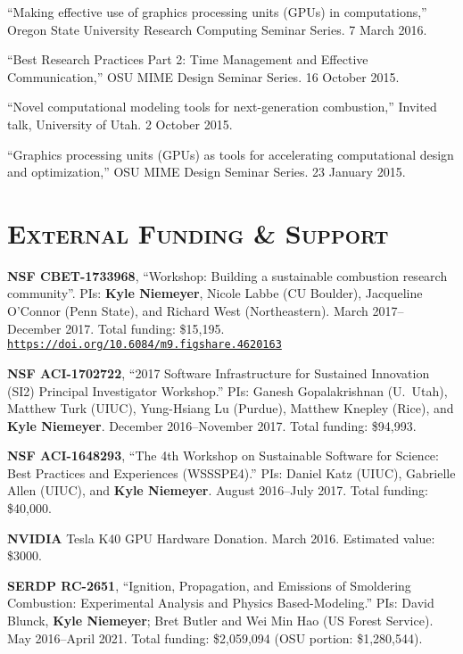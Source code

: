 \documentclass[margin,line,11pt]{res}
\makeatletter
\newlength{\bibhang}
\newlength{\bibsep}
 {\@listi \global\bibsep\itemsep \global\advance\bibsep by\parsep}
\newenvironment{bibenum*}
  {\renewcommand\labelenumi{\theenumi.}%
   \etaremune[
     topsep=0pt,
     itemsep=\bibsep,
     parsep=0pt,partopsep=0pt,
     itemindent=-\bibhang,
     leftmargin={\bibhang+\widthof{[999]}}]}
  {\endetaremune}
\newcommand*{\doi}[1]{\href{https://doi.org/#1}{\nolinkurl{https://doi.org/#1}}}
\makeatother
\begin{document}
\begin{resume}
\begin{bibenum*}
\item ``Making effective use of graphics processing units (GPUs) in computations,''
Oregon State University Research Computing Seminar Series. 7 March 2016.

\item ``Best Research Practices Part 2: Time Management and Effective Communication,''
OSU MIME Design Seminar Series. 16 October 2015.

\item ``Novel computational modeling tools for next-generation combustion,''
Invited talk, University of Utah. 2 October 2015.

\item ``Graphics processing units (GPUs) as tools for accelerating computational design and optimization,''
OSU MIME Design Seminar Series. 23 January 2015.

\end{bibenum*}

\section{\textsc{External Funding \& Support}}

\textbf{NSF CBET-1733968}, ``Workshop: Building a sustainable combustion research community''.
PIs: \textbf{Kyle Niemeyer}, Nicole Labbe (CU Boulder), Jacqueline O'Connor (Penn State), and Richard West (Northeastern).
March 2017--December 2017.
Total funding: \$15,195. \\
\doi{10.6084/m9.figshare.4620163}

\textbf{NSF ACI-1702722}, ``2017 Software Infrastructure for Sustained Innovation (SI2) Principal Investigator Workshop.''
PIs: Ganesh Gopalakrishnan (U.~Utah), Matthew Turk (UIUC), Yung-Hsiang Lu (Purdue), Matthew Knepley (Rice), and \textbf{Kyle Niemeyer}.
December 2016--November 2017.
Total funding: \$94,993.

\textbf{NSF ACI-1648293}, ``The 4th Workshop on Sustainable Software for Science: Best Practices and Experiences (WSSSPE4).''
PIs: Daniel Katz (UIUC), Gabrielle Allen (UIUC), and \textbf{Kyle Niemeyer}.
August 2016--July 2017.
Total funding: \$40,000.

\textbf{NVIDIA} Tesla K40 GPU Hardware Donation. March 2016. Estimated value: \$3000.

\textbf{SERDP RC-2651}, ``Ignition, Propagation, and Emissions of Smoldering Combustion: Experimental Analysis and Physics Based-Modeling.'' PIs: David Blunck, \textbf{Kyle Niemeyer}; Bret Butler and Wei Min Hao (US Forest Service). May 2016--April 2021. Total funding: \$2,059,094 (OSU portion: \$1,280,544).


\end{resume}
\end{document}
